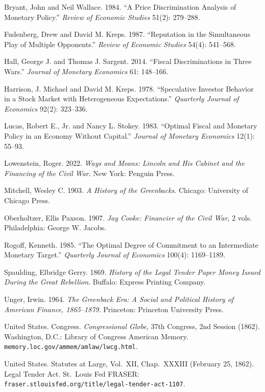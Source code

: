 \documentclass[12pt]{article}
\begin{document}
\begin{description}
\setlength\itemsep{0.5em}

\item Bryant, John and Neil Wallace. 1984. ``A Price Discrimination
Analysis of Monetary Policy.'' \textit{Review of Economic Studies} 51(2):
279--288.

\item Fudenberg, Drew and David M. Kreps. 1987. ``Reputation in the
Simultaneous Play of Multiple Opponents.'' \textit{Review of Economic
Studies} 54(4): 541--568.

\item Hall, George J. and Thomas J. Sargent. 2014. ``Fiscal
Discriminations in Three Wars.'' \textit{Journal of Monetary Economics}
61: 148--166.

\item Harrison, J. Michael and David M. Kreps. 1978. ``Speculative
Investor Behavior in a Stock Market with Heterogeneous Expectations.''
\textit{Quarterly Journal of Economics} 92(2): 323--336.

\item Lucas, Robert E., Jr. and Nancy L. Stokey. 1983. ``Optimal Fiscal
and Monetary Policy in an Economy Without Capital.'' \textit{Journal of
Monetary Economics} 12(1): 55--93.

\item Lowenstein, Roger. 2022. \textit{Ways and Means: Lincoln and His
Cabinet and the Financing of the Civil War}. New York: Penguin Press.

\item Mitchell, Wesley C. 1903. \textit{A History of the Greenbacks}.
Chicago: University of Chicago Press.

\item Oberholtzer, Ellis Paxson. 1907. \textit{Jay Cooke: Financier of
the Civil War}, 2 vols. Philadelphia: George W. Jacobs.

\item Rogoff, Kenneth. 1985. ``The Optimal Degree of Commitment to an
Intermediate Monetary Target.'' \textit{Quarterly Journal of Economics}
100(4): 1169--1189.

\item Spaulding, Elbridge Gerry. 1869. \textit{History of the Legal
Tender Paper Money Issued During the Great Rebellion}. Buffalo: Express
Printing Company.

\item Unger, Irwin. 1964. \textit{The Greenback Era: A Social and
Political History of American Finance, 1865--1879}. Princeton: Princeton
University Press.

\item United States. Congress. \textit{Congressional Globe}, 37th
Congress, 2nd Session (1862). Washington, D.C.: Library of Congress
American Memory. \texttt{memory.loc.gov/ammem/amlaw/lwcg.html}.

\item United States. Statutes at Large, Vol.~XII, Chap.~XXXIII (February
25, 1862). Legal Tender Act. St.\ Louis Fed FRASER:
\texttt{fraser.stlouisfed.org/title/legal-tender-act-1107}.

\end{description}
\end{document}
